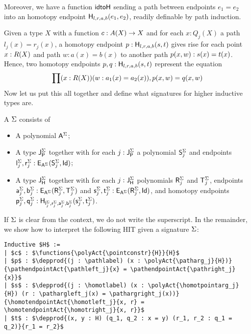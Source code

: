 \vspace{5pt}
Moreover, we have a function $\idtoH$ sending a path between endpoints $e_1 = e_2$ into an homotopy endpoint $\homotendpoint{l}{r}{a}{b}{e_1}{e_2}$, readily definable by path induction.

Given a type $X$ with a function $c : \polyAct{A}{X} \rightarrow X$ and for each $x : Q_j(X)$ a path $l_j(x) = r_j(x)$,
a homotopy endpoint $p : \homotendpoint{l}{r}{a}{b}{s}{t}$ gives rise for each point $x : \polyAct{R}{X}$ and path $w : a(x) = b(x)$
to another path $\homotendpointAct{p}{x, w} : s(x) = t(x)$.
Hence, two homotopy endpoints $p, q : \homotendpoint{l}{r}{a}{b}{s}{t}$ represent the equation
\[
\depprod{(x : \polyAct{R}{X}) (w : a_1(x) = a_2(x))}{\homotendpointAct{p}{x, w} = \homotendpointAct{q}{x, w}}
\]
Now let us put this all together and define what signatures for higher inductive types are.

\begin{definition}
\label{def:signature}
A  $\sign$ consists of
\begin{itemize}
	\item A polynomial $\pointconstr[\sign]$;
	\item A type $\pathlabel[\sign]$ together with for each $j : \pathlabel[\sign]$ a polynomial $\patharg[\sign]_j$ and endpoints $\pathleft[\sign]_j, \pathright[\sign]_j : \pathendpoint{\pointconstr[\sign]}{\patharg[\sign]_j}{\idP}$;
	\item A type $\homotlabel[\sign]$ together with for each $j : \homotlabel[\sign]$ polynomials $\homotpointarg[\sign]_j$ and $\homotpathtarg[\sign]_j$,
	endpoints $\pathargleft[\sign]_j, \pathargright[\sign]_j : \pathendpoint{\pointconstr[\sign]}{\homotpointarg[\sign]_j}{\homotpathtarg[\sign]_j}$
	and $\homotpathleft[\sign]_j, \homotpathright[\sign]_j : \pathendpoint{\pointconstr[\sign]}{\homotpointarg[\sign]_j}{\idP}$,
	and homotopy endpoints $\homotleft[\sign]_j, \homotright[\sign]_j : \homotendpoint{\pathleft[\sign]_j}{\pathright[\sign]_j}{\pathargleft[\sign]_j}{\pathargright[\sign]_j}{\homotpathleft[\sign]_j}{\homotpathright[\sign]_j}$.
\end{itemize}
\end{definition}

If $\sign$ is clear from the context, we do not write the superscript.
In the remainder, we show how to interpret the following HIT given a signature $\sign$:

\begin{lstlisting}[mathescape=true]
Inductive $H$ :=
| $c$ : $\functions{\polyAct{\pointconstr}{H}}{H}$
| $p$ : $\depprod{(j : \pathlabel) (x : \polyAct{\patharg_j}{H})}{\pathendpointAct{\pathleft_j}{x} = \pathendpointAct{\pathright_j}{x}}$
| $s$ : $\depprod{(j : \homotlabel) (x : \polyAct{\homotpointarg_j}{H}) (r : \pathargleft_j(x) = \pathargright_j(x))}{\homotendpointAct{\homotleft_j}{x, r} = \homotendpointAct{\homotright_j}{x, r}}$
| $t$ : $\depprod{(x, y : H) (q_1, q_2 : x = y) (r_1, r_2 : q_1 = q_2)}{r_1 = r_2}$
\end{lstlisting}

